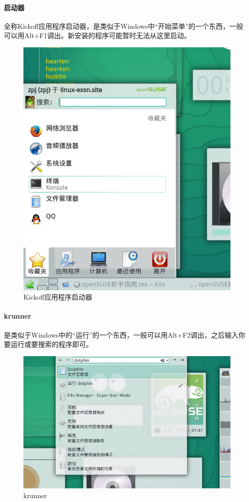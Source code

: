 \documentclass[12pt,openany]{book}
\begin{document}
\paragraph{启动器} 全称Kickoff应用程序启动器，是类似于Windows中“开始菜单”的一个东西，一般可以用Alt+F1调出。新安装的程序可能暂时无法从这里启动。
\begin{figure}[htbp]
\centering
\includegraphics{./pic/kick.png} 
\caption{Kickoff应用程序启动器}
\end{figure}
\paragraph{krunner} 是类似于Windows中的“运行”的一个东西，一般可以用Alt+F2调出，之后输入你要运行或要搜索的程序即可。
\begin{figure}[htbp]
\centering
\includegraphics[width=\textwidth]{./pic/runner.png} 
\caption{krunner}
\end{figure}
\end{document}
